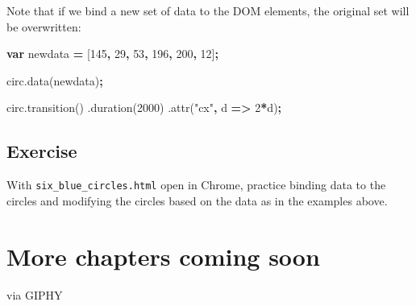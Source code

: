 \documentclass[openany]{book}
\newenvironment{Shaded}{\begin{snugshade}}{\end{snugshade}}
\newcommand{\AttributeTok}[1]{\textcolor[rgb]{0.77,0.63,0.00}{#1}}
\newcommand{\DecValTok}[1]{\textcolor[rgb]{0.00,0.00,0.81}{#1}}
\newcommand{\KeywordTok}[1]{\textcolor[rgb]{0.13,0.29,0.53}{\textbf{#1}}}
\newcommand{\NormalTok}[1]{#1}
\newcommand{\OperatorTok}[1]{\textcolor[rgb]{0.81,0.36,0.00}{\textbf{#1}}}
\newcommand{\StringTok}[1]{\textcolor[rgb]{0.31,0.60,0.02}{#1}}
\newcommand{\VariableTok}[1]{\textcolor[rgb]{0.00,0.00,0.00}{#1}}
\begin{document}
Note that if we bind a new set of data to the DOM elements, the original set will be overwritten:

\begin{Shaded}
\begin{Highlighting}[]
\KeywordTok{var}\NormalTok{ newdata }\OperatorTok{=}\NormalTok{ [}\DecValTok{145}\OperatorTok{,} \DecValTok{29}\OperatorTok{,} \DecValTok{53}\OperatorTok{,} \DecValTok{196}\OperatorTok{,} \DecValTok{200}\OperatorTok{,} \DecValTok{12}\NormalTok{]}\OperatorTok{;}

\VariableTok{circ}\NormalTok{.}\AttributeTok{data}\NormalTok{(newdata)}\OperatorTok{;}

\VariableTok{circ}\NormalTok{.}\AttributeTok{transition}\NormalTok{()}
\NormalTok{    .}\AttributeTok{duration}\NormalTok{(}\DecValTok{2000}\NormalTok{)}
\NormalTok{    .}\AttributeTok{attr}\NormalTok{(}\StringTok{"cx"}\OperatorTok{,}\NormalTok{ d }\OperatorTok{=>} \DecValTok{2}\OperatorTok{*}\NormalTok{d)}\OperatorTok{;}
\end{Highlighting}
\end{Shaded}

\hypertarget{exercise-3}{%
\section{Exercise }\label{exercise-3}}

With \texttt{six\_blue\_circles.html} open in Chrome, practice binding data to the circles and modifying the circles based on the data as in the examples above.

\hypertarget{more-chapters-coming-soon}{%
\chapter{More chapters coming soon }\label{more-chapters-coming-soon}}

via GIPHY


\end{document}
